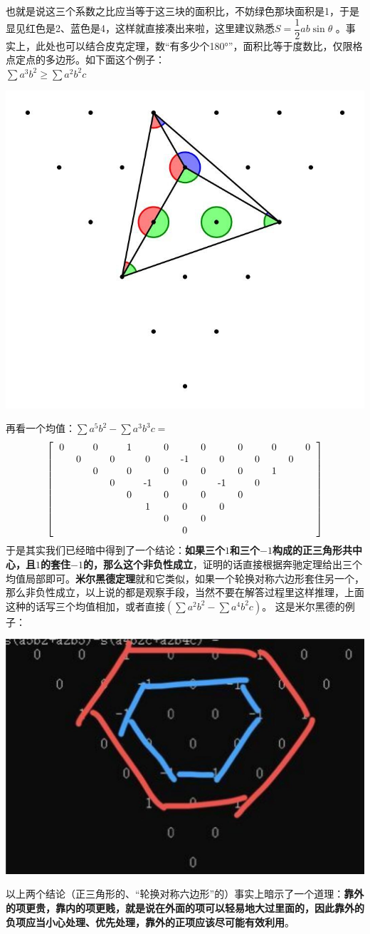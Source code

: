 \documentclass[UTF8]{ctexart}
\begin{document}
也就是说这三个系数之比应当等于这三块的面积比，不妨绿色那块面积是1，于是显见红色是2、蓝色是4，这样就直接凑出来啦，这里建议熟悉$ S=\displaystyle \dfrac{1}{2}ab  \sin \theta $
。事实上，此处也可以结合皮克定理，数“有多少个180°”，面积比等于度数比，仅限格点定点的多边形。如下面这个例子：\\
$ \displaystyle  \sum a^{3} b^{2} \geq \displaystyle  \sum a^{2} b^{2} c $

\begin{center}
	\includegraphics[width=0.4\linewidth]{0140}
\end{center}

再看一个均值：$ \displaystyle  \sum a^{5}b^{2}-\displaystyle  \sum a^{3}b^{3}c= $
\renewcommand*{\arraystretch}{1.732}\[\left[\begin{matrix}
	\begin{tabular}{ccccccccccccccc}
		0& &0& &1& &0& &0& &0& &0& &0\\
		&0& &0& &0& &-1& &0& &0& &0&\\
		& &0& &0& &0& &0& &0& &1& &\\
		& & &0& &-1& &0& &-1& &0& & &\\
		& & & &0& &0& &0& &0& & & &\\
		& & & & &1& &0& &0& & & & &\\
		& & & & & &0& &0& & & & & &\\
		& & & & & & &0& & & & & & &\\
	\end{tabular}
\end{matrix}\right]\]
于是其实我们已经暗中得到了一个结论：\textbf{如果三个$ 1 $和三个$ -1 $构成的正三角形共中心，且$ 1 $的套住$ -1 $的，那么这个非负性成立}，证明的话直接根据奔驰定理给出三个均值局部即可。\textbf{米尔黑德定理}就和它类似，如果一个轮换对称六边形套住另一个，那么非负性成立，以上说的都是观察手段，当然不要在解答过程里这样推理，上面这种的话写三个均值相加，或者直接$ (\displaystyle \sum a^{2}b^{2}-\displaystyle \sum a^{4}b^{2}c) $。
这是米尔黑德的例子：
\begin{center}
	\includegraphics[width=0.45\linewidth]{0150}
\end{center}
以上两个结论（正三角形的、“轮换对称六边形”的）事实上暗示了一个道理：\textbf{靠外的项更贵，靠内的项更贱，就是说在外面的项可以轻易地大过里面的，因此靠外的负项应当小心处理、优先处理，靠外的正项应该尽可能有效利用}。\\
\end{document}
